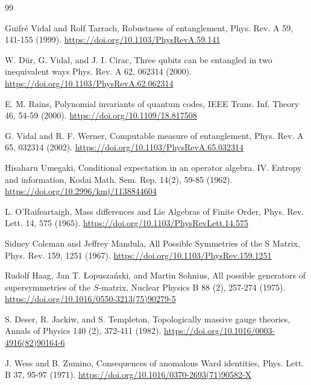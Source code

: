 \documentclass[12pt,a4paper]{article}
\begin{document}
\begin{thebibliography}{99}
	
	Guifré Vidal and Rolf Tarrach,
	Robustness of entanglement,
	Phys. Rev. A 59, 141-155 (1999).
	\url{https://doi.org/10.1103/PhysRevA.59.141}
	
	
	
	W. Dür, G. Vidal, and J. I. Cirac,
	Three qubits can be entangled in two inequivalent ways
	Phys. Rev. A 62, 062314 (2000).
	\url{https://doi.org/10.1103/PhysRevA.62.062314}
	
	
	E. M. Rains,  
	Polynomial invariants of quantum codes,  
	IEEE Trans. Inf. Theory 46, 54-59 (2000).  
	\url{https://doi.org/10.1109/18.817508}
	
	
	G. Vidal and R. F. Werner,
	Computable measure of entanglement,
	Phys. Rev. A 65, 032314 (2002).
	\url{https://doi.org/10.1103/PhysRevA.65.032314}
	
	
	Hisaharu Umegaki,
	Conditional expectation in an operator algebra. IV. Entropy and information,
	Kodai Math. Sem. Rep. 14(2), 59-85 (1962).
	\url{https://doi.org/10.2996/kmj/1138844604}
	
	
	L. O'Raifeartaigh,
	Mass differences and Lie Algebras of Finite Order,
	Phys. Rev. Lett. 14, 575 (1965).
	\url{https://doi.org/10.1103/PhysRevLett.14.575}
	
	
	Sidney Coleman and Jeffrey Mandula,
	All Possible Symmetries of the S Matrix,
	Phys. Rev. 159, 1251 (1967).
	\url{https://doi.org/10.1103/PhysRev.159.1251} 
	
	
	Rudolf Haag, Jan T. Łopuszański, and Martin Sohnius,
	All possible generators of supersymmetries of the $S$-matrix,
	Nuclear Physics B 88 (2), 257-274 (1975).
	\url{https://doi.org/10.1016/0550-3213(75)90279-5}
	
	
	
	S. Deser, R. Jackiw, and S. Templeton,  
	Topologically massive gauge theories,
	Annals of Physics 140 (2), 372-411 (1982).
	\url{https://doi.org/10.1016/0003-4916(82)90164-6}
	
	
	J. Wess and B. Zumino,
	Consequences of anomalous Ward identities,
	Phys. Lett. B 37, 95-97 (1971).
	\url{https://doi.org/10.1016/0370-2693(71)90582-X}
	

\end{thebibliography}
\end{document}
